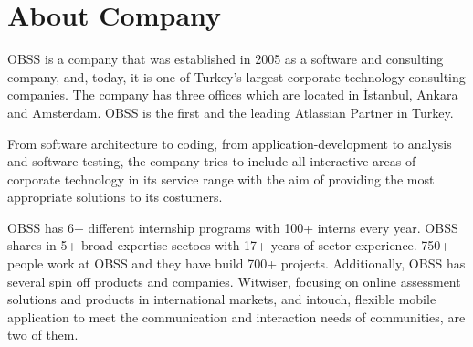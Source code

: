 \section{About Company}

OBSS is a company that was established in 2005 as a software and consulting company, and, today, it is one of Turkey's largest corporate technology consulting companies. The company has three offices which are located in İstanbul, Ankara and Amsterdam. OBSS is the first and the leading Atlassian Partner in Turkey.

From software architecture to coding, from application-development to analysis and software testing, the company tries to include all interactive areas of corporate technology in its service range with the aim of providing the most appropriate solutions to its costumers.

OBSS has 6+ different internship programs with 100+ interns every year. OBSS shares in 5+ broad expertise sectoes with 17+ years of sector experience. 750+ people work at OBSS and they have build 700+ projects. Additionally, OBSS has several spin off products and companies. Witwiser, focusing on online assessment solutions and products in international markets, and intouch, flexible mobile application to meet the communication and interaction needs of communities, are two of them.
